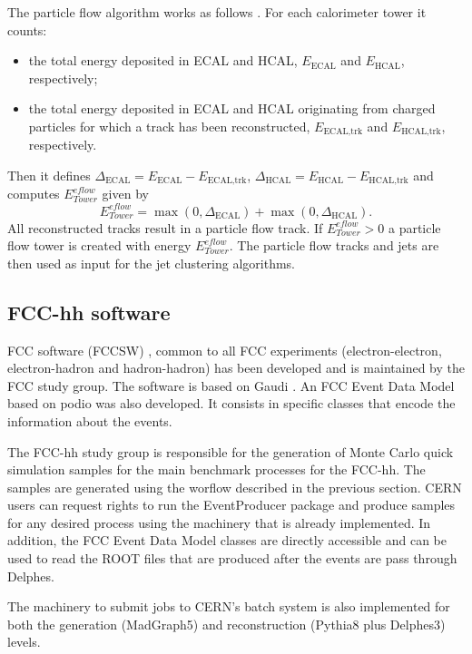 The particle flow algorithm works as follows \cite{Delphes}. For each calorimeter tower it counts:
\begin{itemize}
	\item the total energy deposited in ECAL and HCAL, $E_{\text{ECAL}}$ and $E_{\text{HCAL}}$, respectively;
	\item the total energy deposited in ECAL and HCAL originating from charged particles for which a track has been reconstructed, $E_{\text{ECAL,trk}}$ and $E_{\text{HCAL,trk}}$, respectively.
\end{itemize}
Then it defines $\Delta_{\text{ECAL}}=E_{\text{ECAL}}-E_{\text{ECAL,trk}}$, $\Delta_{\text{HCAL}}=E_{\text{HCAL}}-E_{\text{HCAL,trk}}$ and computes $E^{eflow}_{Tower}$ given by
\begin{equation}
	E^{eflow}_{Tower}=\max(0,\Delta_{\text{ECAL}})+\max(0,\Delta_{\text{HCAL}}).
\end{equation}
All reconstructed tracks result in a particle flow track. If $E^{eflow}_{Tower}>0$ a particle flow tower is created with energy $E^{eflow}_{Tower}$. The particle flow tracks and jets are then used as input for the jet clustering algorithms.

\subsection{FCC-hh software}
\label{subsec:FCC_software}

FCC software (FCCSW) \cite{FCCSW}, common to all FCC experiments (electron-electron, electron-hadron and hadron-hadron) has been developed and is maintained by the FCC study group. The software is based on Gaudi \cite{gaudi}. An FCC Event Data Model based on podio \cite{Podio} was also developed. It consists in specific classes that encode the information about the events.

The FCC-hh study group is responsible for the generation of Monte Carlo quick simulation samples for the main benchmark processes for the FCC-hh. The samples are generated using the worflow described in the previous section. CERN users can request rights to run the EventProducer package \cite{FCCEventProducer} and produce samples for any desired process using the machinery that is already implemented. In addition, the FCC Event Data Model classes are directly accessible and can be used to read the ROOT files that are produced after the events are pass through Delphes.

The machinery to submit jobs to CERN's batch system is also implemented for both the generation (MadGraph5) and reconstruction (Pythia8 plus Delphes3) levels.

